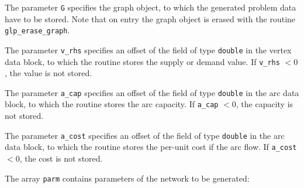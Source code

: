 \documentclass[dvipdfm,11pt]{report}
\begin{document}
The parameter \verb|G| specifies the graph object, to which the
generated  problem data have to be stored. Note that on entry the graph
object  is erased with the routine \verb|glp_erase_graph|.

The parameter \verb|v_rhs| specifies an offset of the field of type
\verb|double| in the vertex data block, to which the routine stores the
supply or  demand value. If \verb|v_rhs| $<0$, the value is not stored.

The parameter \verb|a_cap| specifies an offset of the field of type
\verb|double| in the arc data block, to which the routine stores the
arc capacity. If \verb|a_cap| $<0$, the capacity is not stored.

The parameter \verb|a_cost| specifies an offset of the field of type
\verb|double| in the arc data block, to which the routine stores the
per-unit cost if the arc flow. If \verb|a_cost| $<0$, the cost is not
stored.

The array \verb|parm| contains parameters of the network to be
generated:
\end{document}
